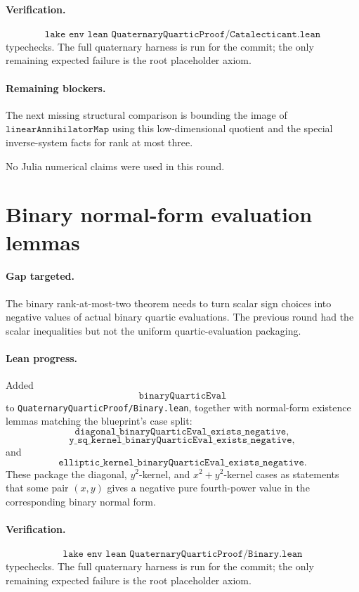 \documentclass[11pt]{article}
\begin{document}
\paragraph{Verification.}
\[
\texttt{lake env lean QuaternaryQuarticProof/Catalecticant.lean}
\]
typechecks.  The full quaternary harness is run for the commit; the only
remaining expected failure is the root placeholder axiom.

\paragraph{Remaining blockers.}
The next missing structural comparison is bounding the image of
\(\texttt{linearAnnihilatorMap}\) using this low-dimensional quotient and the
special inverse-system facts for rank at most three.

No Julia numerical claims were used in this round.

\section*{Binary normal-form evaluation lemmas}

\paragraph{Gap targeted.}
The binary rank-at-most-two theorem needs to turn scalar sign choices into
negative values of actual binary quartic evaluations.  The previous round had
the scalar inequalities but not the uniform quartic-evaluation packaging.

\paragraph{Lean progress.}
Added
\[
\texttt{binaryQuarticEval}
\]
to \texttt{QuaternaryQuarticProof/Binary.lean}, together with normal-form
existence lemmas matching the blueprint's case split:
\[
\texttt{diagonal\_binaryQuarticEval\_exists\_negative},
\]
\[
\texttt{y\_sq\_kernel\_binaryQuarticEval\_exists\_negative},
\]
and
\[
\texttt{elliptic\_kernel\_binaryQuarticEval\_exists\_negative}.
\]
These package the diagonal, \(y^2\)-kernel, and \(x^2+y^2\)-kernel cases as
statements that some pair \((x,y)\) gives a negative pure fourth-power value in
the corresponding binary normal form.

\paragraph{Verification.}
\[
\texttt{lake env lean QuaternaryQuarticProof/Binary.lean}
\]
typechecks.  The full quaternary harness is run for the commit; the only
remaining expected failure is the root placeholder axiom.
\end{document}
